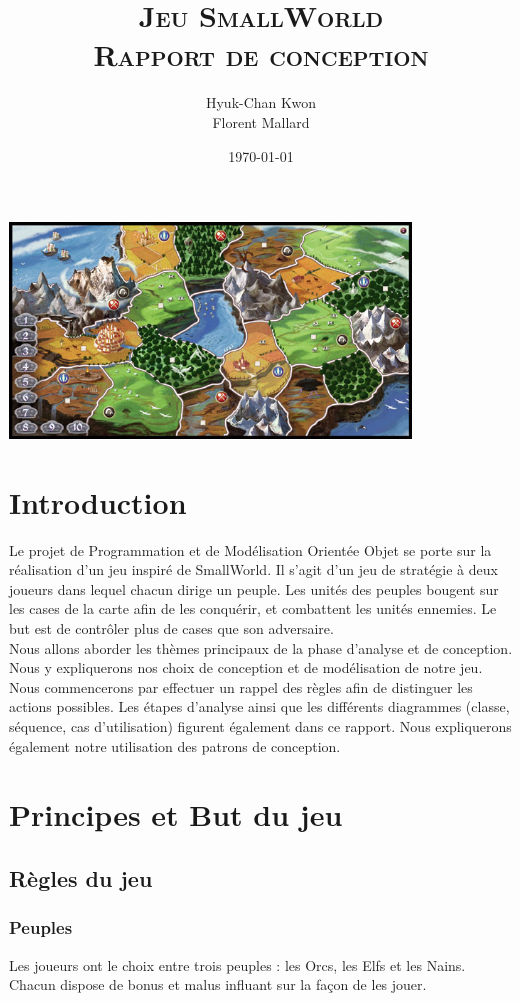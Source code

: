 \documentclass[a4paper]{article}
\title{
\textsc{Jeu SmallWorld\\
\LARGE Rapport de conception}
}
\author
{
	Hyuk-Chan {\sc Kwon}\\
    Florent {\sc Mallard}\\
}
\date{\today}
\begin{document}
\maketitle
\begin{center}
\includegraphics[width=0.8\textwidth]{./smallworld.jpg}~\\[5cm]
\end{center}

\newpage
\tableofcontents
\newpage


\section*{Introduction}
Le projet de Programmation et de Modélisation Orientée Objet se porte sur la réalisation d'un jeu inspiré de SmallWorld. Il s'agit d'un jeu de stratégie à deux joueurs dans lequel chacun dirige un peuple. Les unités des peuples bougent sur les cases de la carte afin de les conquérir, et combattent les unités ennemies. Le but est de contrôler plus de cases que son adversaire.\\
Nous allons aborder les thèmes principaux de la phase d'analyse et de conception.
Nous y expliquerons nos choix de conception  et de modélisation de notre jeu. Nous commencerons par effectuer un rappel des règles afin de distinguer les actions possibles.
Les étapes d'analyse ainsi que les différents diagrammes (classe, séquence, cas d'utilisation) figurent également dans ce rapport.
Nous expliquerons également notre utilisation des patrons de conception.

\section{Principes et But du jeu}
	\subsection{Règles du jeu}
		\subsubsection{Peuples}
Les joueurs ont le choix entre trois peuples : les Orcs, les Elfs et les Nains. Chacun dispose de bonus et malus influant sur la façon de les jouer.
\end{document}
